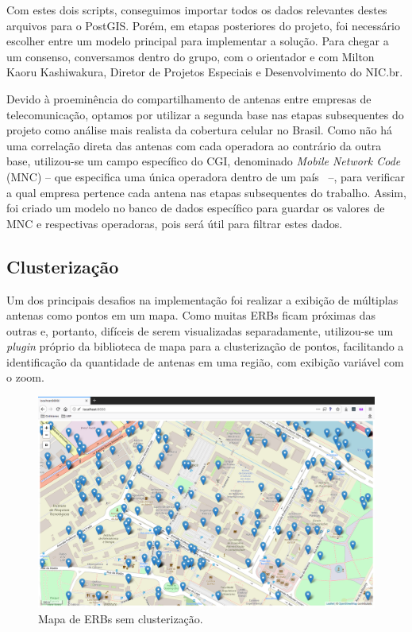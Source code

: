 \documentclass[]{politex}
\begin{document}
Com estes dois scripts, conseguimos importar todos os dados relevantes destes
arquivos para o PostGIS. Porém, em etapas posteriores do projeto, foi necessário
escolher entre um modelo principal para implementar a solução. Para chegar a um
consenso, conversamos dentro do grupo, com o orientador e com Milton Kaoru
Kashiwakura, Diretor de Projetos Especiais e Desenvolvimento do NIC.br.

Devido à proeminência do compartilhamento de antenas entre empresas de
telecomunicação, optamos por utilizar a segunda base nas etapas subsequentes do
projeto como análise mais realista da cobertura celular no Brasil. Como não há
uma correlação direta das antenas com cada operadora ao contrário da outra
base, utilizou-se um campo específico do CGI, denominado \textit{Mobile Network
Code} (MNC) -- que especifica uma única operadora dentro de um país~\cite{mcc-mnc}
--, para verificar a qual empresa pertence cada antena nas etapas subsequentes
do trabalho. Assim, foi criado um modelo no banco de dados específico para
guardar os valores de MNC e respectivas operadoras, pois será útil para filtrar
estes dados.

\subsection{Clusterização}

Um dos principais desafios na implementação foi realizar a exibição de múltiplas
antenas como pontos em um mapa. Como muitas ERBs ficam próximas das outras e,
portanto, difíceis de serem visualizadas separadamente, utilizou-se um
\textit{plugin} próprio da biblioteca de mapa para a clusterização de pontos,
facilitando a identificação da quantidade de antenas em uma região, com exibição
variável com o zoom.

\begin{figure}[H]
    \centering
    \includegraphics[width=6in]{imagens/mapa_sem_clusters}
    \caption{Mapa de ERBs sem clusterização.}
    \label{fig:mapa_sem_clusters}
\end{figure}
\end{document}
